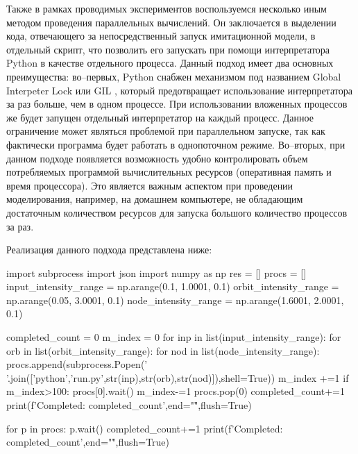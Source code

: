 Также в рамках проводимых экспериментов воспользуемся несколько иным методом проведения параллельных вычислений. Он заключается в выделении кода, отвечающего за непосредственный запуск имитационной модели, в отдельный скрипт, что позволить его запускать при помощи интерпретатора Python в качестве отдельного процесса. Данный подход имеет два основных преимущества: во--первых, Python снабжен механизмом под названием Global Interpeter Lock или GIL \cite{gil}, который предотвращает использование интерпретатора за раз больше, чем в одном процессе. При использовании вложенных процессов же будет запущен отдельный интерпретатор на каждый процесс. Данное ограничение может являться проблемой при параллельном запуске, так как фактически программа будет работать в однопоточном режиме. Во--вторых, при данном подходе появляется возможность удобно контролировать объем потребляемых программой вычислительных ресурсов (оперативная память и время процессора). Это является важным аспектом при проведении моделирования, например, на домашнем компьютере, не обладающим достаточным количеством ресурсов для запуска большого количество процессов за раз.

Реализация данного подхода представлена ниже:

\begin{pyin} 
import subprocess
import json
import numpy as np
res = []
procs = []
input_intensity_range = np.arange(0.1, 1.0001, 0.1)
orbit_intensity_range = np.arange(0.05, 3.0001, 0.1)
node_intensity_range = np.arange(1.6001, 2.0001, 0.1)

completed_count = 0
m_index = 0
for inp in list(input_intensity_range):
   for orb in list(orbit_intensity_range):
      for nod in list(node_intensity_range):
         procs.append(subprocess.Popen(' '.join(['python','run.py',str(inp),str(orb),str(nod)]),shell=True))
         m_index +=1
         if m_index>100:
            procs[0].wait()
            m_index-=1
            procs.pop(0)
            completed_count+=1
            print(f'Completed: {completed_count}',end="\r",flush=True)


for p in procs:
   p.wait()
   completed_count+=1
   print(f'Completed: {completed_count}',end="\r",flush=True)
\end{pyin}

